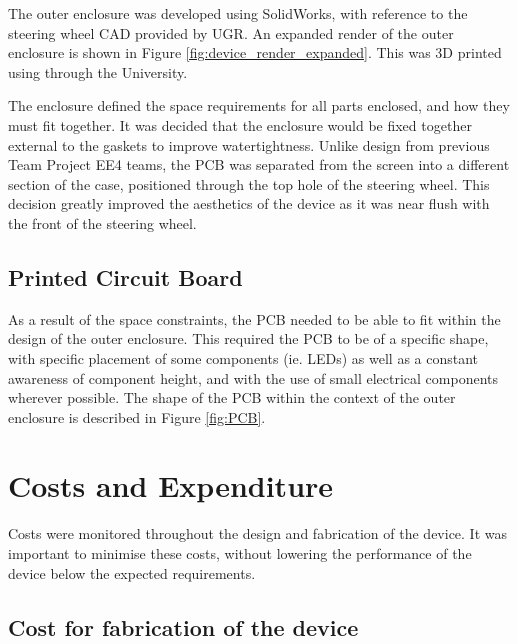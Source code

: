 \documentclass[a4paper,12pt]{article}
\begin{document}
The outer enclosure was developed using SolidWorks, with reference to the steering wheel CAD provided by UGR. An expanded render of the outer enclosure is shown in Figure \ref{fig:device_render_expanded}. This was 3D printed using through the University.



The enclosure defined the space requirements for all parts enclosed, and how they must fit together. It was decided that the enclosure would be fixed together external to the gaskets to improve watertightness. Unlike design from previous Team Project EE4 teams, the PCB was separated from the screen into a different section of the case, positioned through the top hole of the steering wheel. This decision greatly improved the aesthetics of the device as it was near flush with the front of the steering wheel.

\subsection{Printed Circuit Board}
\label{sec:printed_circuit_board}

As a result of the space constraints, the PCB needed to be able to fit within the design of the outer enclosure. This required the PCB to be of a specific shape, with specific placement of some components (ie. LEDs) as well as a constant awareness of component height, and with the use of small electrical components wherever possible. The shape of the PCB within the context of the outer enclosure is described in Figure \ref{fig:PCB}.




\newpage
\section{Costs and Expenditure}
\label{sec:cost}

Costs were monitored throughout the design and fabrication of the device. It was important to minimise these costs, without lowering the performance of the device below the expected requirements.

\subsection{Cost for fabrication of the device}
\label{sec:device_cost}
\end{document}
